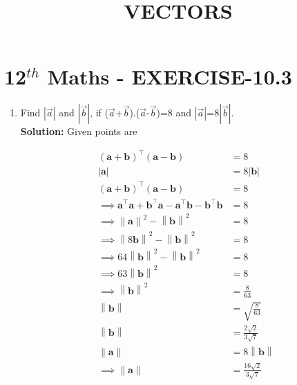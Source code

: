 \documentclass[10pt]{article}
\providecommand{\brak}[1]{\ensuremath{\left(#1\right)}}
\newcommand{\solution}{\noindent \textbf{Solution: }}
\providecommand{\norm}[1]{\left\lVert#1\right\rVert}
\providecommand{\abs}[1]{\left\vert#1\right\vert}
\let\vec\mathbf{}
\begin{document}
\begin{center}
\title{\textbf{VECTORS}}
\date{\vspace{-5ex}} %
\maketitle
\end{center}

\section{12$^{th}$ Maths - EXERCISE-10.3}

\begin{enumerate}
\item Find $\abs{\overrightarrow{a}}$ and $\abs{\overrightarrow{b}}$, if ($\overrightarrow{a}$+$\overrightarrow{b}$)$.$($\overrightarrow{a}$-$\overrightarrow{b}$)=8 and $\abs{\overrightarrow{a}}$=8$\abs{\overrightarrow{b}}$.\\  

\solution
Given  points are

\begin{align}
\brak{\vec{a}+\vec{b}}^\top\brak{\vec{a}-\vec{b}}&=8\\
\abs{\vec{a}}&=8\abs{\vec{b}}\\
\brak{\vec{a}+\vec{b}}^\top\brak{\vec{a}-\vec{b}}&=8\\
\implies\vec{a}^\top\vec{a}+\vec{b}^\top\vec{a}-\vec{a}^\top\vec{b}-\vec{b}^\top\vec{b}&=8\\
\implies\norm{\vec{a}}^2-\norm{\vec{b}}^2&=8\\
\implies\norm{8\vec{b}}^2-\norm{\vec{b}}^2&=8\\
\implies64{\norm{\vec{b}}}^2-\norm{\vec{b}}^2&=8\\
\implies63{\norm{\vec{b}}}^2&=8\\
\implies\norm{\vec{b}}^2&=\frac{8}{63}\\
\norm{\vec{b}}&=\sqrt{\frac{8}{63}}\\
\norm{\vec{b}}&=\frac{2\sqrt{2}}{3\sqrt{7}}\\
\norm{\vec{a}}&=8\norm{\vec{b}}\\
\implies\norm{\vec{a}}&=\frac{16\sqrt{2}}{3\sqrt{7}}
\end{align}
\end{enumerate}
\end{document}
